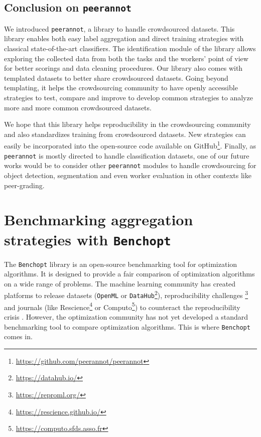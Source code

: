 \subsection{Conclusion on \texttt{peerannot}}
We introduced \texttt{peerannot}, a library to handle crowdsourced datasets. This library enables both easy label aggregation and direct training strategies with classical state-of-the-art classifiers. The identification module of the library allows exploring the collected data from both the tasks and the workers' point of view for better scorings and data cleaning procedures.
Our library also comes with templated datasets to better share crowdsourced datasets.
Going beyond templating, it helps the crowdsourcing community to have openly accessible strategies to test, compare and improve to develop common strategies to analyze more and more common crowdsourced datasets.

We hope that this library helps reproducibility in the crowdsourcing community and also standardizes training from crowdsourced datasets. New strategies can easily be incorporated into the open-source code available on GitHub\footnote{\url{https://github.com/peerannot/peerannot}}. Finally, as \texttt{peerannot} is mostly directed to handle classification datasets, one of our future works would be to consider other \texttt{peerannot} modules to handle crowdsourcing for object detection, segmentation and even worker evaluation in other contexts like peer-grading.

\section{Benchmarking aggregation strategies with \texttt{Benchopt}}
\label{sec:benchopt}

The \texttt{Benchopt} library is an open-source benchmarking tool for optimization algorithms.
It is designed to provide a fair comparison of optimization algorithms on a wide range of problems.
The machine learning community has created platforms to release datasets (\texttt{OpenML} \citep{OpenML2013} or \texttt{DataHub}\footnote{\url{https://datahub.io/}}), reproducibility challenges \footnote{\url{https://reproml.org/}} and journals (like Rescience\footnote{\url{https://rescience.github.io/}} or Computo\footnote{\url{https://computo.sfds.asso.fr}}) to counteract the reproducibility crisis \citep{baker2016reproducibility}.
However, the optimization community has not yet developed a standard benchmarking tool to compare optimization algorithms.
This is where \texttt{Benchopt} comes in.


